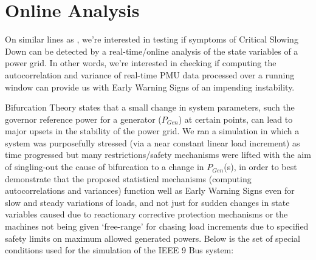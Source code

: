 \section[Online/Real-time Analysis]{Online Analysis}
\label{sec:online}

On similar lines as \cite{ghanvati01, sanchez01}, we're interested in testing if symptoms of Critical Slowing Down can be detected by a real-time/online analysis of the state variables of a power grid. In other words, we're interested in checking if computing the autocorrelation and variance of real-time PMU data processed over a running window can provide us with Early Warning Signs of an impending instability.

Bifurcation Theory states that a small change in system parameters, such the governor reference power for a generator ($P_{Gen}$) at certain points, can lead to major upsets in the stability of the power grid. We ran a simulation in which a system was purposefully stressed (via a near constant linear load increment) as time progressed but many restrictions/safety mechanisms were lifted with the aim of singling-out the cause of bifurcation to a change in $P_{Gen}$(s), in order to best demonstrate that the proposed statistical mechanisms (computing autocorrelations and variances) function well as Early Warning Signs even for slow and steady variations of loads, and not just for sudden changes in state variables caused due to reactionary corrective protection mechanisms or the machines not being given `free-range' for chasing load increments due to specified safety limits on maximum allowed generated powers. Below is the set of special conditions used for the simulation of the IEEE 9 Bus system:


